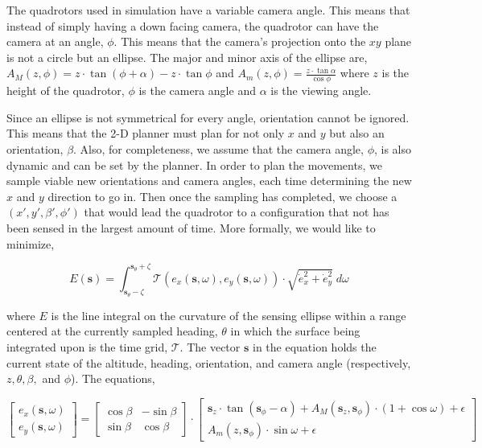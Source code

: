 \documentclass[12pt]{article}
\newcommand{\s}{\textbf{s}}
\begin{document}
The quadrotors used in simulation have a variable camera angle. This means that
instead of simply having a down facing camera, the quadrotor can have the
camera at an angle, $\phi$. This means that the camera's projection onto the
$xy$ plane is not a circle but an ellipse. The major and minor axis of the
ellipse are, $ A_M(z, \phi) = z \cdot \tan{(\phi + \alpha)} - z \cdot
\tan{\phi} $ and $ A_m(z, \phi) = \frac{z \cdot \tan{\alpha}}{\cos{\phi}} $
where $z$ is the height of the quadrotor, $\phi$ is the camera angle and
$\alpha$ is the viewing angle.

Since an ellipse is not symmetrical for every angle, orientation cannot be
ignored.  This means that the 2-D planner must plan for not only $x$ and $y$
but also an orientation, $\beta$. Also, for completeness, we assume that the
camera angle, $\phi$, is also dynamic and can be set by the planner. In order
to plan the movements, we sample viable new orientations and camera angles,
each time determining the new $x$ and $y$ direction to go in.  Then once the
sampling has completed, we choose a $(x', y',
\beta', \phi')$ that would lead the quadrotor to a configuration that not has
been sensed in the largest amount of time. More formally, we would like to
minimize,

$$ E(\s) = \int_{\s_{\theta} - \zeta}^{\s_{\theta} + \zeta}
\mathcal{T}(e_x(\s, \omega), e_y(\s, \omega)) \cdot \sqrt{\dot{e}_x ^ 2 +
\dot{e}_y ^ 2} \;d\omega$$

where $E$ is the line integral on the curvature of the sensing ellipse within a
range centered at the currently sampled heading, $\theta$ in which the surface
being integrated upon is the time grid, $\mathcal{T}$. The vector $\s$ in the
equation holds the current state of the altitude, heading, orientation, and
camera angle (respectively, $z, \theta, \beta,$ and $\phi$). The equations,

$$
\begin{bmatrix}
    e_x(\s, \omega) \\[0.2em] e_y(\s, \omega)
\end{bmatrix} = \begin{bmatrix} \cos{\beta} & -\sin{\beta} \\[0.2em]
    \sin{\beta}
& \cos{\beta} \end{bmatrix}\cdot \begin{bmatrix} \s_z \cdot 
    \tan(\s_{\phi} - \alpha) +
    A_M(\s_z, \s_{\phi}) \cdot (1 + \cos{\omega}) + \epsilon \\[0.2em]
    A_m(z, \s_{\phi}) \cdot
\sin{\omega} + \epsilon \end{bmatrix} $$
\end{document}
